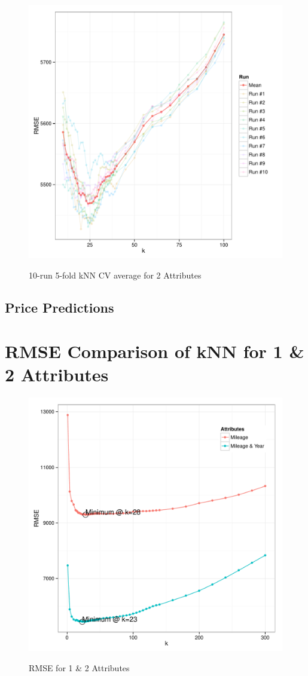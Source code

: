 \documentclass[11pt, fleqn]{article}
\begin{document}
\begin{figure}[!htb]
  \centering
  \caption{10-run 5-fold kNN CV average for 2 Attributes}
  \includegraphics[scale=.5]{2p_cv_multi_k.pdf}
  \label{fig:2p_k_multi}
\end{figure}


\subsection{Price Predictions}


\section{RMSE Comparison of kNN for 1 \& 2 Attributes}
\begin{figure}[!htb]
  \centering
  \caption{RMSE for 1 \& 2 Attributes}
  \includegraphics[scale=.5]{1p_2p_cv_compare.pdf}
  \label{fig:p_compare}
\end{figure}
\end{document}

